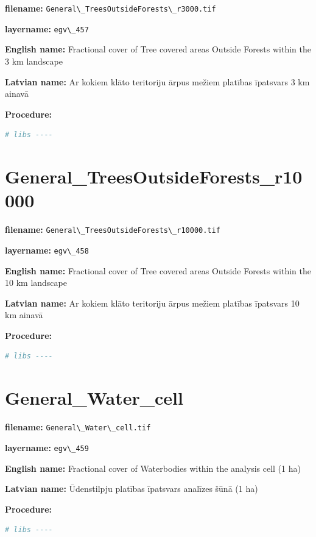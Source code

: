 \documentclass[
]{book}
\newcommand{\passthrough}[1]{#1}
\begin{document}
\textbf{filename:} \passthrough{\lstinline!General\_TreesOutsideForests\_r3000.tif!}

\textbf{layername:} \passthrough{\lstinline!egv\_457!}

\textbf{English name:} Fractional cover of Tree covered areas Outside Forests within the 3 km landscape

\textbf{Latvian name:} Ar kokiem klāto teritoriju ārpus mežiem platības īpatsvars 3 km ainavā

\textbf{Procedure:}

\begin{lstlisting}[language=R]
# libs ----
\end{lstlisting}

\section{General\_TreesOutsideForests\_r10000}\label{ch06.458}

\textbf{filename:} \passthrough{\lstinline!General\_TreesOutsideForests\_r10000.tif!}

\textbf{layername:} \passthrough{\lstinline!egv\_458!}

\textbf{English name:} Fractional cover of Tree covered areas Outside Forests within the 10 km landscape

\textbf{Latvian name:} Ar kokiem klāto teritoriju ārpus mežiem platības īpatsvars 10 km ainavā

\textbf{Procedure:}

\begin{lstlisting}[language=R]
# libs ----
\end{lstlisting}

\section{General\_Water\_cell}\label{ch06.459}

\textbf{filename:} \passthrough{\lstinline!General\_Water\_cell.tif!}

\textbf{layername:} \passthrough{\lstinline!egv\_459!}

\textbf{English name:} Fractional cover of Waterbodies within the analysis cell (1 ha)

\textbf{Latvian name:} Ūdenstilpju platības īpatsvars analīzes šūnā (1 ha)

\textbf{Procedure:}

\begin{lstlisting}[language=R]
# libs ----
\end{lstlisting}
\end{document}
